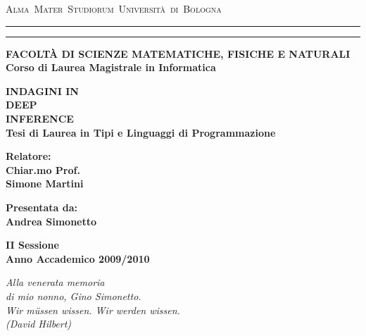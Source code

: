 \documentclass[12pt,a4paper,openright,twoside]{report}
\begin{document}
\begin{titlepage}
	\topmargin=0cm
	\begin{center}
		\mbox{{\large{\textsc{Alma Mater Studiorum  Universit\`a di Bologna}}}}
		\rule[0.1cm]{14.0cm}{0.1mm}
		\rule[0.5cm]{14.0cm}{0.6mm}
		{\small{\bf FACOLT\`A DI SCIENZE MATEMATICHE, FISICHE E NATURALI\\
		Corso di Laurea Magistrale in Informatica}}
	\end{center}
	\vspace{15mm}
	\begin{center}
		{\LARGE{\bf INDAGINI IN}}\\
		\vspace{3mm}
		{\LARGE{\bf DEEP}}\\
		\vspace{3mm}
		{\LARGE{\bf INFERENCE}}\\
		\vspace{19mm} {\large{\bf Tesi di Laurea in Tipi e Linguaggi di Programmazione}}
	\end{center}
	\vspace{40mm}\par\noindent
	\begin{minipage}[t]{0.52\textwidth}
		{\large{\bf Relatore:\\
		Chiar.mo Prof.\\
		Simone Martini}}
	\end{minipage}
	\hfill
	\begin{minipage}[t]{0.52\textwidth}\raggedleft
		{\large{\bf Presentata da:\\
		Andrea Simonetto}}
	\end{minipage}
	\vspace{20mm}
	\begin{center}
		{\large{\bf II Sessione\\
		Anno Accademico 2009/2010}}
	\end{center}
\end{titlepage}
\clearpage{\pagestyle{empty}\cleardoublepage}
\begin{titlepage}
	\thispagestyle{empty}
	\topmargin=5cm
	\raggedleft\large\emph{
		Alla venerata memoria \\
		di mio nonno, Gino Simonetto.} \\
	\vspace{3em}
	\raggedleft\large\emph{
		Wir m\"ussen wissen. Wir werden wissen. \\
		(David Hilbert)} \\
	\newpage
	\clearpage{\pagestyle{empty}\cleardoublepage}
\end{titlepage}
\end{document}
